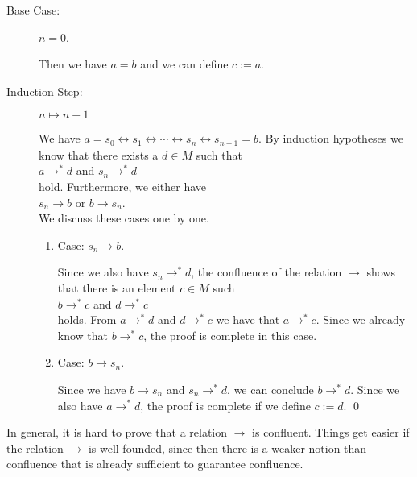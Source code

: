 \begin{description}
\item[Base Case:] $n = 0$.
  
      Then we have $a = b$ and we can define $c := a$.
\item[Induction Step:] $n \mapsto n+1$
      
      We have $a = s_0 \leftrightarrow s_1 \leftrightarrow \cdots \leftrightarrow s_{n} \leftrightarrow s_{n+1} = b$.
      By induction hypotheses we know that there exists a $d \in M$ such that
      \\[0.2cm]
      \hspace*{1.3cm}
      $a \rightarrow^* d$ \quad and \quad $s_{n} \rightarrow^* d$ 
      \\[0.2cm]
      hold.  Furthermore, we either have
      \\[0.2cm]
      \hspace*{1.3cm}
      $s_{n} \rightarrow b$ \quad or \quad $b \rightarrow s_{n}$.
      \\[0.2cm]
      We discuss these cases one by one.
      \begin{enumerate}
      \item Case: $s_n \rightarrow b$.

        Since we also have $s_{n} \rightarrow^* d$, the confluence of the relation $\rightarrow$ shows that
        there is an element $c \in M$ such 
        \\[0.2cm]
        \hspace*{1.3cm}
        $b \rightarrow^* c$ \quad and \quad $d \rightarrow^* c$ 
        \\[0.2cm]
        holds.  From $a \rightarrow^* d$ and $d \rightarrow^* c$ we have that $a \rightarrow^* c$.  Since we already
        know that $b \rightarrow^* c$, the proof is complete in this case. 
      \item Case: $b \rightarrow s_n$.

        Since we have $b \rightarrow s_n$ and $s_n \rightarrow^* d$, we can conclude
        $b \rightarrow^* d$.  Since we also have $a \rightarrow^* d$, the proof is
        complete if we define $c := d$.  \qed
      \end{enumerate}
\end{description}
In general, it is hard to prove that a relation $\rightarrow$ is confluent.  Things get easier if the relation
$\rightarrow$ is well-founded, since then there is a weaker notion than confluence that is already sufficient
to guarantee confluence.

